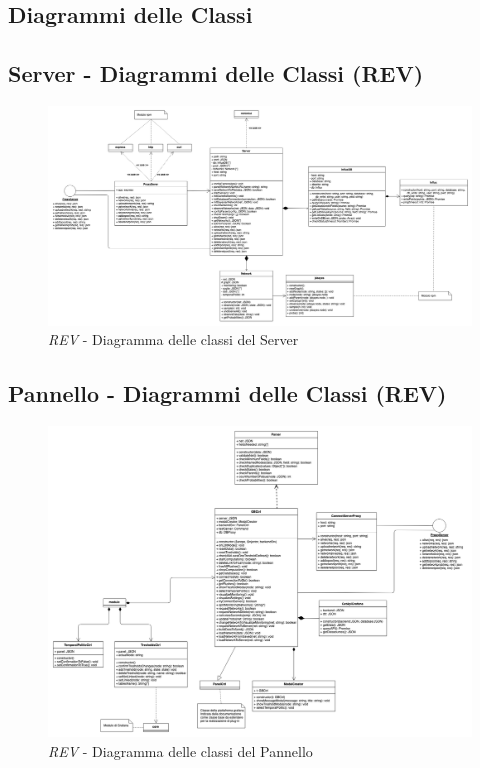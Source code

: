 \begin{landscape}
	\section{Diagrammi delle Classi}
	\subsection{Server - Diagrammi delle Classi (REV)}
	\begin{figure}[H]
		\begin{center}
			\includegraphics[scale=0.20]{./images/serverClassiv2.png} 
		\end{center}
		\caption{\textit{REV} - Diagramma delle classi del Server}
	\end{figure}
\end{landscape}


\begin{landscape}
	\subsection{Pannello - Diagrammi delle Classi (REV)}
	\begin{figure}[H]
		\begin{center}
			\includegraphics[scale=0.20]{./images/panelClassiv2.png} 
		\end{center}
		\caption{\textit{REV} - Diagramma delle classi del Pannello}
	\end{figure}
\end{landscape}

